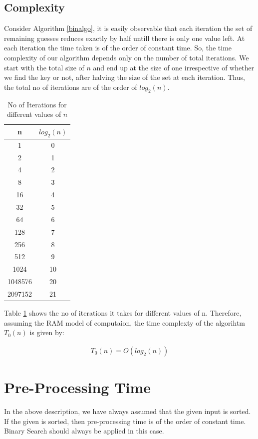 \documentclass{article}
\begin{document}
\subsection{Complexity}
Consider Algorithm \ref{binalgo}, it is easily observable that each iteration the set of remaining guesses reduces exactly by half untill there is only one value left.
At each iteration the time taken is of the order of constant time. So, the time complexity of our algorithm depends only on the number of total iterations. 
We start with the total size of $n$ and end up at the size of one irrespective of whether we find the key or not, after halving the size of the set at each iteration.
Thus, the total no of iterations are of the order of $log_2(n)$. \\
\begin{table}[h!]
\begin{center}
\begin{tabular}{|c|c|}
\hline
n & $log_2(n)$ \\
\hline
1 & 0 \\
2 & 1 \\
4 & 2 \\
8 & 3 \\
16 & 4 \\
32 & 5 \\
64 & 6 \\
128 & 7 \\
256 & 8 \\
512 & 9 \\
1024 & 10\\
1048576 & 20 \\
2097152 & 21 \\
\hline
\end{tabular}
\caption{No of Iterations for different values of $n$ }
\label{table:one}
\end{center}
\end{table}

Table \ref{table:one} shows the no of iterations it takes for different values of n. 
Therefore, assuming the RAM model of computaion, the time complexty of the algorihtm $T_0(n)$ is given by:

\begin{align}
T_0(n) = O(log_2(n))
\label{eq:bin1}
\end{align}


\section{Pre-Processing Time}
\label{sec:pre}
In the above description, we have always assumed that the given input is sorted.
If the given is sorted, then pre-processing time is of the order of constant time.
Binary Search should always be applied in this case. \\
\end{document}
